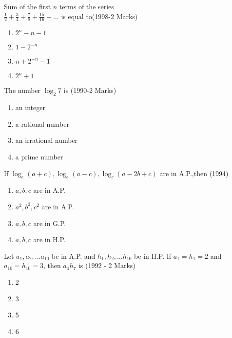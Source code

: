 \iffalse
\title{6. Sequences and Series}
\author{Deepak - EE24BTECH11014}
\section{mcq-single}
\fi
    \item Sum of the first $ n$ terms of the series \\
$ \frac{1}{2}+ \frac{3}{4}+ \frac{7}{8}+ \frac{15}{16}+ \dots $ is equal to\hfill (1998-2 Marks)
\begin{multicols}{4}
\begin{enumerate}
    \item $2^n-n-1$  
    \item $1-2^{-n}$
    \item $n+2^{-n}-1$
    \item $2^n+1$
    \end{enumerate}
    \end{multicols}
\item The number ${\log_2}7$ is \hfill(1990-2 Marks)
    \begin{multicols}{2}
    \begin{enumerate}
        \item an integer
        \item a rational number
        \item an irrational number
        \item a prime number
    \end{enumerate}
    \end{multicols}
\item If $\log_e(a+c),\log_e(a-c),\log_e(a-2b+c)$ are in A.P.,then \hfill (1994)
    \begin{multicols}{2}
        
    \begin{enumerate}
        \item $a,b,c$ are in A.P.
        \item $a^2,b^2,c^2$ are in A.P.
        \item $a,b,c$ are in G.P.
        \item $a,b,c$ are in H.P.
    \end{enumerate}
    \end{multicols}
\item Let ${a_1,a_2,\dots a_{10}}$ be in A.P. and ${h_1,h_2, \dots h_{10}}$ be in H.P. If ${a_1}={h_1}=2$ and ${a_{10}}={h_{10}}=3$, then ${a_4h_7}$ is \hfill(1992 - 2 Marks)
    \begin{multicols}{4}
    \begin{enumerate}
        \item 2
        \item 3
        \item 5
        \item 6
        \end{enumerate}
        \end{multicols}
